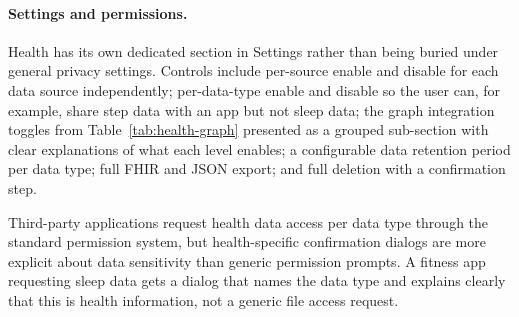 \paragraph{Settings and permissions.}
Health has its own dedicated section in Settings rather than being buried under
general privacy settings. Controls include per-source enable and disable for
each data source independently; per-data-type enable and disable so the user
can, for example, share step data with an app but not sleep data; the graph
integration toggles from Table~\ref{tab:health-graph} presented as a grouped
sub-section with clear explanations of what each level enables; a configurable
data retention period per data type; full FHIR and JSON export; and full
deletion with a confirmation step.

Third-party applications request health data access per data type through the
standard permission system, but health-specific confirmation dialogs are more
explicit about data sensitivity than generic permission prompts. A fitness app
requesting sleep data gets a dialog that names the data type and explains
clearly that this is health information, not a generic file access request.
